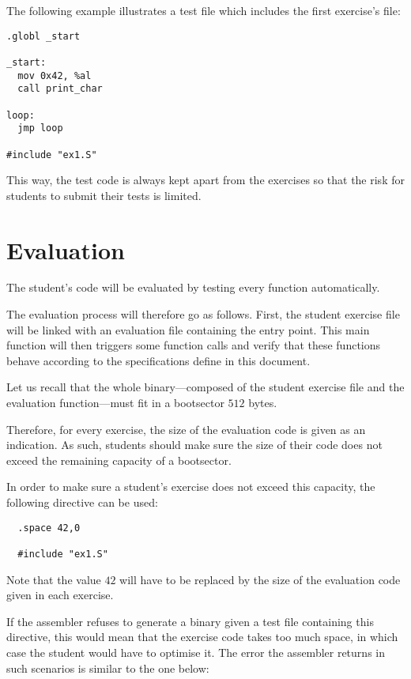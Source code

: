 The following example illustrates a test file which includes the first
exercise's file:

\begin{verbatim}
.globl _start

_start:
  mov 0x42, %al
  call print_char

loop:
  jmp loop

#include "ex1.S"
\end{verbatim}

This way, the test code is always kept apart from the exercises so that
the risk for students to submit their tests is limited.

%
%

\section{Evaluation}

The student's code will be evaluated by testing every function automatically.

The evaluation process will therefore go as follows. First, the student
exercise file will be linked with an evaluation file containing the entry
point. This main function will then triggers some function calls and verify
that these functions behave according to the specifications define in this
document.

Let us recall that the whole binary---composed of the student exercise file
and the evaluation function---must fit in a bootsector \ie{} $512$ bytes.

Therefore, for every exercise, the size of the evaluation code is given
as an indication. As such, students should make sure the size of their code
does not exceed the remaining capacity of a bootsector.

In order to make sure a student's exercise does not exceed this capacity,
the following directive can be used:

\begin{verbatim}
  .space 42,0

  #include "ex1.S"
\end{verbatim}

Note that the value $42$ will have to be replaced by the size of the
evaluation code given in each exercise.

If the assembler refuses to generate a binary given a test file containing
this directive, this would mean that the exercise code takes too much space,
in which case the student would have to optimise it. The error the assembler
returns in such scenarios is similar to the one below:


